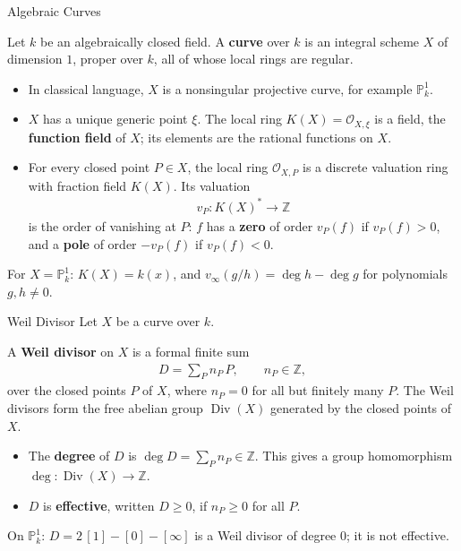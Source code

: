 \documentclass[10pt,aspectratio=1610]{beamer}
\DeclareMathOperator{\Div}{Div}
\newcommand{\OO}{\mathcal{O}}
\newcommand{\PP}{\mathbb{P}}
\newcommand{\Z}{\mathbb{Z}}
\begin{document}
    \begin{frame}{Algebraic Curves}
        \begin{definition}[Curve]
            Let $k$ be an algebraically closed field. A \textbf{curve} over $k$ is an integral scheme $X$ of dimension $1$, proper over $k$, all of whose local rings are regular.
        \end{definition}
        \begin{itemize}
            \item In classical language, $X$ is a nonsingular projective curve, for example $\PP^1_k$.
            \item $X$ has a unique generic point $\xi$. The local ring $K(X) = \OO_{X,\xi}$ is a field, the \textbf{function field} of $X$; its elements are the rational functions on $X$.
            \item For every closed point $P \in X$, the local ring $\OO_{X,P}$ is a discrete valuation ring with fraction field $K(X)$. Its valuation
            \begin{align*}
                v_P \colon K(X)^* \to \Z
            \end{align*}
            is the order of vanishing at $P$: $f$ has a \textbf{zero} of order $v_P(f)$ if $v_P(f) > 0$, and a \textbf{pole} of order $-v_P(f)$ if $v_P(f) < 0$.
        \end{itemize}
        \begin{example}
            For $X = \PP^1_k$: $K(X) = k(x)$, and $v_\infty(g/h) = \deg h - \deg g$ for polynomials $g, h \neq 0$.
        \end{example}
    \end{frame}

    \begin{frame}{Weil Divisor}
        Let $X$ be a curve over $k$.
        \begin{definition}
            A \textbf{Weil divisor} on $X$ is a formal finite sum
            \begin{align*}
                D = \sum_{P} n_P \, P, \qquad n_P \in \Z,
            \end{align*}
            over the closed points $P$ of $X$, where $n_P = 0$ for all but finitely many $P$. The Weil divisors form the free abelian group $\Div(X)$ generated by the closed points of $X$.
        \end{definition}
        \begin{itemize}
            \item The \textbf{degree} of $D$ is $\deg D = \sum_P n_P \in \Z$. This gives a group homomorphism $\deg \colon \Div(X) \to \Z$.
            \item $D$ is \textbf{effective}, written $D \geq 0$, if $n_P \geq 0$ for all $P$.
        \end{itemize}
        \begin{example}
            On $\PP^1_k$: $D = 2\,[1] - [0] - [\infty]$ is a Weil divisor of degree $0$; it is not effective.
        \end{example}
    \end{frame}
\end{document}

